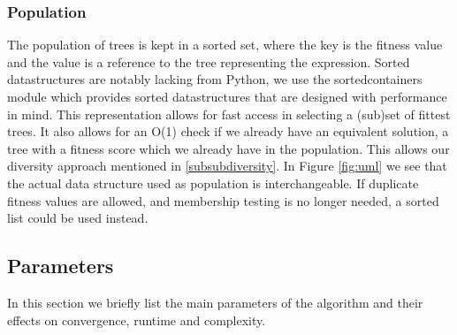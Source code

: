 \subsubsection{Population}
The population of trees is kept in a sorted set, where the key is the fitness value and the value is a reference to the tree representing the expression.  Sorted datastructures are notably lacking from Python, we use the sortedcontainers \cite{sortedcontainers} module which provides sorted datastructures that are designed with performance in mind.
This representation allows for fast access in selecting a (sub)set of fittest trees. It also allows for an O(1) check if we already have an equivalent solution, a tree with a fitness score which we already have in the population. This allows our diversity approach mentioned in \ref{subsubdiversity}.
In Figure \ref{fig:uml} we see that the actual data structure used as population is interchangeable. If duplicate fitness values are allowed, and membership testing is no longer needed, a sorted list could be used instead.

\subsection{Parameters}
In this section we briefly list the main parameters of the algorithm and their effects on convergence, runtime and complexity.
